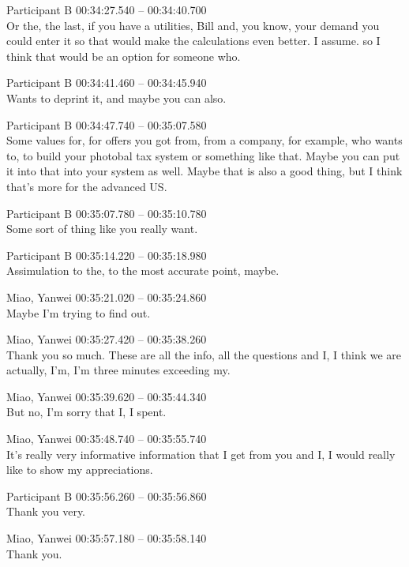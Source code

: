 {Participant B 00:34:27.540 -- 00:34:40.700 \\
Or the, the last, if you have a utilities, Bill and, you know, your demand you could enter it so that would make the calculations even better. I assume. so I think that would be an option for someone who.

Participant B 00:34:41.460 -- 00:34:45.940 \\
Wants to deprint it, and maybe you can also.

Participant B 00:34:47.740 -- 00:35:07.580 \\
Some values for, for offers you got from, from a company, for example, who wants to, to build your photobal tax system or something like that. Maybe you can put it into that into your system as well. Maybe that is also a good thing, but I think that's more for the advanced US.

Participant B 00:35:07.780 -- 00:35:10.780 \\
Some sort of thing like you really want.

Participant B 00:35:14.220 -- 00:35:18.980 \\
Assimulation to the, to the most accurate point, maybe.

Miao, Yanwei 00:35:21.020 -- 00:35:24.860 \\
Maybe I'm trying to find out.

Miao, Yanwei 00:35:27.420 -- 00:35:38.260 \\
Thank you so much. These are all the info, all the questions and I, I think we are actually, I'm, I'm three minutes exceeding my.

Miao, Yanwei 00:35:39.620 -- 00:35:44.340 \\
But no, I'm sorry that I, I spent.

Miao, Yanwei 00:35:48.740 -- 00:35:55.740 \\
It's really very informative information that I get from you and I, I would really like to show my appreciations.

Participant B 00:35:56.260 -- 00:35:56.860 \\
Thank you very.

Miao, Yanwei 00:35:57.180 -- 00:35:58.140 \\
Thank you.
}